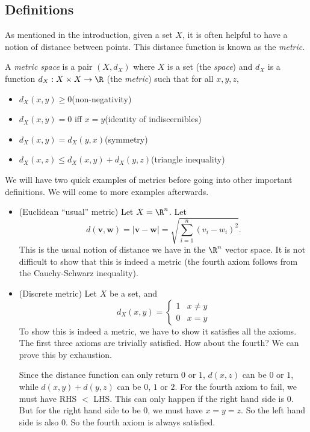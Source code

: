 \documentclass[a4paper]{article}
\begin{document}
\subsection{Definitions}
As mentioned in the introduction, given a set $X$, it is often helpful to have a notion of distance between points. This distance function is known as the \emph{metric}.
\begin{defi}
  A \emph{metric space} is a pair $(X, d_X)$ where $X$ is a set (the \emph{space}) and $d_X$ is a function $d_X: X \times X \to \R$ (the \emph{metric}) such that for all $x, y, z$,
  \begin{itemize}
    \item $d_X(x, y) \geq 0$\hfill(non-negativity)
    \item $d_X(x, y) = 0$ iff $x = y$\hfill(identity of indiscernibles)
    \item $d_X(x, y) = d_X(y, x)$\hfill(symmetry)
    \item $d_X(x, z) \leq d_X(x, y) + d_X(y, z)$\hfill(triangle inequality)
  \end{itemize}
\end{defi}

We will have two quick examples of metrics before going into other important definitions. We will come to more examples afterwards.
\begin{eg}\leavevmode
  \begin{itemize}
    \item (Euclidean ``usual'' metric) Let $X = \R^n$. Let
      \[
        d(\mathbf{v}, \mathbf{w}) = |\mathbf{v} - \mathbf{w}| = \sqrt{\sum_{i = 1}^n (v_i - w_i)^2}.
      \]
      This is the usual notion of distance we have in the $\R^n$ vector space. It is not difficult to show that this is indeed a metric (the fourth axiom follows from the Cauchy-Schwarz inequality).
    \item (Discrete metric) Let $X$ be a set, and
      \[
        d_X(x, y) =
        \begin{cases}
          1 & x \not= y\\
          0 & x = y
        \end{cases}
      \]
      To show this is indeed a metric, we have to show it satisfies all the axioms. The first three axioms are trivially satisfied. How about the fourth? We can prove this by exhaustion.

      Since the distance function can only return $0$ or $1$, $d(x, z)$ can be $0$ or $1$, while $d(x, y) + d(y, z)$ can be $0$, $1$ or $2$. For the fourth axiom to fail, we must have RHS $<$ LHS. This can only happen if the right hand side is $0$. But for the right hand side to be $0$, we must have $x = y = z$. So the left hand side is also $0$. So the fourth axiom is always satisfied.
  \end{itemize}
\end{eg}
\end{document}
